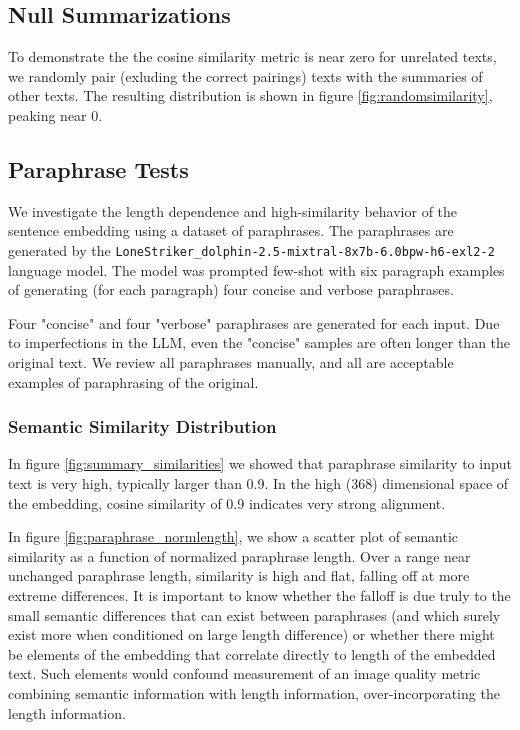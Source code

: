 \documentclass{article}
\begin{document}
{\subsection{Null Summarizations}

To demonstrate the the cosine similarity metric is near zero for unrelated texts, we randomly pair (exluding the correct pairings) texts with the summaries of other texts.  
The resulting distribution is shown in figure \ref{fig:randomsimilarity}, peaking near 0.

\subsection{Paraphrase Tests}

We investigate the length dependence and high-similarity behavior of the sentence embedding using a dataset of paraphrases.  
The paraphrases are generated by the \texttt{LoneStriker\_dolphin-2.5-mixtral-8x7b-6.0bpw-h6-exl2-2} language model.  
The model was prompted few-shot with six paragraph examples of generating (for each paragraph) four concise and verbose paraphrases.

Four "concise" and four "verbose" paraphrases are generated for each input. 
Due to imperfections in the LLM, even the "concise" samples are often longer than the original text.
We review all paraphrases manually, and all are acceptable examples of paraphrasing of the original.

\subsubsection{Semantic Similarity Distribution}

In figure \ref{fig:summary_similarities}
we showed that paraphrase similarity to input text is very high, typically larger than 0.9.  
In the high (368) dimensional space of the embedding, cosine similarity of 0.9 indicates very strong alignment.  

In figure \ref{fig:paraphrase_normlength}, 
we show a scatter plot of semantic similarity as a function of normalized paraphrase length.  Over a range near unchanged paraphrase length, similarity is high and flat, falling off at more extreme differences.
It is important to know whether the falloff is due truly to the small semantic differences that can exist between paraphrases (and which surely exist more when conditioned on large length difference) or whether there might be elements of the embedding that correlate directly to length of the embedded text. 
Such elements would confound measurement of an image quality metric combining semantic information with length information, over-incorporating the length information.

}
\end{document}
